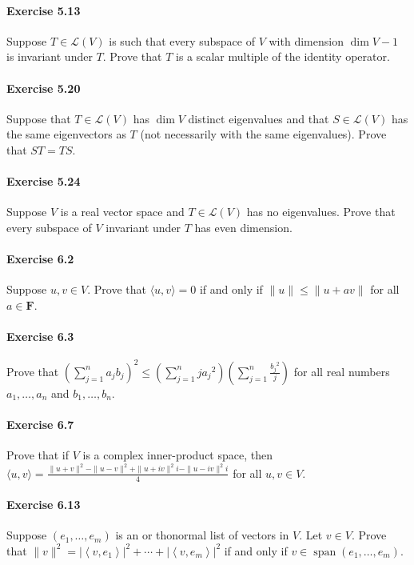 \documentclass{article}
\begin{document}
\paragraph{Exercise 5.13} Suppose $T \in \mathcal{L}(V)$ is such that every subspace of $V$ with dimension $\operatorname{dim} V-1$ is invariant under $T$. Prove that $T$ is a scalar multiple of the identity operator.

\paragraph{Exercise 5.20} Suppose that $T \in \mathcal{L}(V)$ has $\operatorname{dim} V$ distinct eigenvalues and that $S \in \mathcal{L}(V)$ has the same eigenvectors as $T$ (not necessarily with the same eigenvalues). Prove that $S T=T S$.

\paragraph{Exercise 5.24} Suppose $V$ is a real vector space and $T \in \mathcal{L}(V)$ has no eigenvalues. Prove that every subspace of $V$ invariant under $T$ has even dimension.

\paragraph{Exercise 6.2} Suppose $u, v \in V$. Prove that $\langle u, v\rangle=0$ if and only if $\|u\| \leq\|u+a v\|$ for all $a \in \mathbf{F}$.

\paragraph{Exercise 6.3} Prove that $\left(\sum_{j=1}^{n} a_{j} b_{j}\right)^{2} \leq\left(\sum_{j=1}^{n} j a_{j}{ }^{2}\right)\left(\sum_{j=1}^{n} \frac{b_{j}{ }^{2}}{j}\right)$ for all real numbers $a_{1}, \ldots, a_{n}$ and $b_{1}, \ldots, b_{n}$.

\paragraph{Exercise 6.7} Prove that if $V$ is a complex inner-product space, then $\langle u, v\rangle=\frac{\|u+v\|^{2}-\|u-v\|^{2}+\|u+i v\|^{2} i-\|u-i v\|^{2} i}{4}$ for all $u, v \in V$.

\paragraph{Exercise 6.13} Suppose $\left(e_{1}, \ldots, e_{m}\right)$ is an or thonormal list of vectors in $V$. Let $v \in V$. Prove that $\|v\|^{2}=\left|\left\langle v, e_{1}\right\rangle\right|^{2}+\cdots+\left|\left\langle v, e_{m}\right\rangle\right|^{2}$ if and only if $v \in \operatorname{span}\left(e_{1}, \ldots, e_{m}\right)$.
\end{document}
